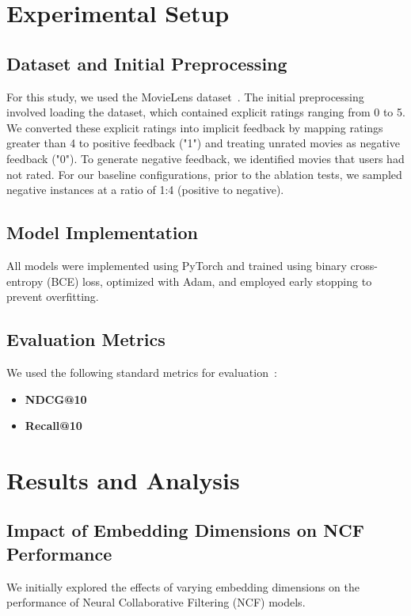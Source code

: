 \documentclass[runningheads]{llncs}
\begin{document}
\section{Experimental Setup}

\subsection{Dataset and Initial Preprocessing}
For this study, we used the MovieLens dataset~\cite{harper2015movielens}. The initial preprocessing involved loading the dataset, which contained explicit ratings ranging from 0 to 5. We converted these explicit ratings into implicit feedback by mapping ratings greater than 4 to positive feedback ("1") and treating unrated movies as negative feedback ("0"). To generate negative feedback, we identified movies that users had not rated. For our baseline configurations, prior to the ablation tests, we sampled negative instances at a ratio of 1:4 (positive to negative).

\subsection{Model Implementation}
All models were implemented using PyTorch and trained using binary cross-entropy (BCE) loss, optimized with Adam, and employed early stopping to prevent overfitting.

\subsection{Evaluation Metrics}
We used the following standard metrics for evaluation~\cite{he2020lightgcn}:

\begin{itemize}
    \item \textbf{NDCG@10}
    \item \textbf{Recall@10}
\end{itemize}

\section{Results and Analysis}

\subsection{Impact of Embedding Dimensions on NCF Performance}

We initially explored the effects of varying embedding dimensions on the performance of Neural Collaborative Filtering (NCF) models. 
\end{document}
